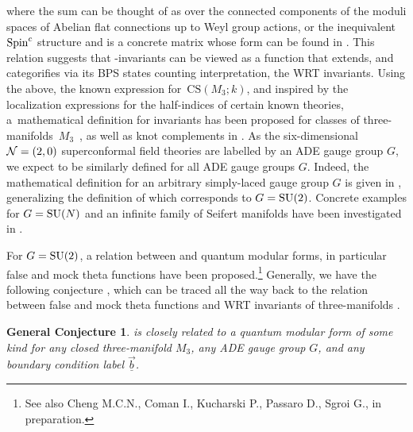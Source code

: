 \documentclass[10pt,a4paper]{amsart}
\newcommand{\Zhshort}[3]{\ensuremath{\widehat{Z}^{#1}_{#2}\left(#3\right)}}
\def\bv{{\vec{\underline{b}}}}
\newtheorem*{conj*}{General Conjecture}
\theoremstyle{definition}
\numberwithin{equation}{section}
\begin{document}
where the sum can be thought of as over the connected components of the moduli spaces of Abelian flat connections up to Weyl group actions, or the inequivalent ${\rm Spin}^c$ structure and  is a concrete matrix whose form can be found in \cite{cheng20193d,gukov2019two,Gukov:2017kmk}. This relation suggests that -invariants can be viewed as a function that extends, and categorifies via its BPS states counting interpretation, the WRT invariants. Using the above, the known expression for~$\mathrm{CS}(M_3;k)$, and inspired by the localization expressions for the half-indices of certain known theories, a~mathematical definition for \smash{$\Zhshort{G}{\bv}{M_3}$} invariants has been proposed for classes of three-manifolds~$M_3$~\cite{Gukov:2017kmk}, as well as knot complements in \cite{gukov2019two}. As the six-dimensional ${\cal N}=(2,0)$ superconformal field theories are labelled by an ADE gauge group $G$, we expect \smash{$\widehat Z^G_\bv(M_3)$} to be similarly defined for all ADE gauge groups $G$. Indeed, the mathematical definition for an arbitrary simply-laced gauge group $G$ is given in \cite{Park:2019xey}, generalizing the definition of \cite{Gukov:2017kmk} which corresponds to $G={\rm SU}(2)$. Concrete examples for $G={\rm SU}(N)$ and an infinite family of Seifert manifolds have been investigated in \cite{Chung:2018rea}.

For $G={\rm SU}(2)$, a relation between \smash{$\Zhshort{{\rm SU}(2)}{\bv}{M_3}$} and quantum modular forms, in particular false \cite{Bringmann_2020,bringmann2019quantum,cheng20193d} and mock theta functions \cite{cheng20193d, Cheng:2019uzc, Park:2021ufu} %
have been proposed.\footnote{See also Cheng M.C.N., Coman I., Kucharski P., Passaro D., Sgroi G., in preparation.} Generally, we have the following conjecture \cite{cheng20193d}, which can be traced all the way back to the relation between false and mock theta functions and WRT invariants of three-manifolds \cite{2005RCD10509H, HIKAMI_2005, 2004mathph9016H,lawrence1999modular}.
\begin{conj*}
\smash{$\widehat Z^G_\bv(M_3)$} is closely related to a quantum modular form of some kind for any closed three-manifold $M_3$, any ADE gauge group $G$, and any boundary condition label $\bv$.
\end{conj*}
\end{document}
